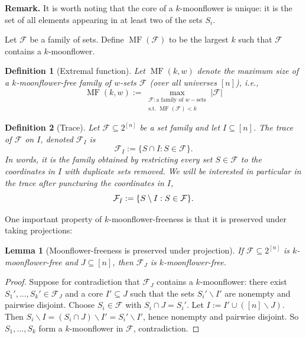 \documentclass{article}
\newtheorem{lemma}[lemma]{Lemma}
\newtheorem{definition}[definition]{Definition}
\DeclareMathOperator{\MF}{MF}
\newcommand{\<}{\langle}
\renewcommand{\>}{\rangle}
\newcommand{\calF}{\mathcal{F}}
\begin{document}
\noindent \textbf{Remark. }
It is worth noting that the core of a $k$-moonflower is unique: it is the set of all elements appearing in at least two of the sets $S_i$. 

Let $\calF$ be a family of sets. Define \emph{$\MF(\calF)$} to be the largest $k$ such that $\calF$ contains a $k$-moonflower.

\begin{definition}[Extremal function]\label{definition:extremal-moonflower}
    Let $\MF(k, w)$ denote the maximum size of a $k$-moonflower-free family of $w$-sets $\calF$ (over all universes $[n]$), i.e.,
    \[
    \MF(k, w) := \max_{\substack{\calF: \text{a family of }w-\text{sets} \\
    \text{s.t. }\MF(\calF) < k}} |\calF|
    \]
\end{definition}

\begin{definition}[Trace]\label{definition:trace}
    Let $\calF \subseteq 2^{[n]}$ be a set family and let $I \subseteq [n]$. The \emph{trace} of $\calF$ on $I$, denoted $\calF_I$ is
    \[
    \calF_I:= \{S \cap I: S \in \calF\}.
    \]
    In words, it is the family obtained by restricting every set $S \in \calF$ to the coordinates in $I$ with duplicate sets removed. We will be interested in particular in the trace after \emph{puncturing} the coordinates in $I$,
    \[
    \calF_{\Bar{I}}:= \{S \setminus I: S \in \calF\}.
    \]
\end{definition}

One important property of $k$-moonflower-freeness is that it is preserved under taking projections:
\begin{lemma}[Moonflower-freeness is preserved under projection]\label{lem:WSF_free_preserved_under_projection} If $\calF \subseteq 2^{[n]}$ is $k$-moonflower-free and $J \subseteq [n]$, then $\calF_J$ is $k$-moonflower-free.
\end{lemma}

\begin{proof}
    Suppose for contradiction that $\calF_J$ contains a $k$-moonflower: there exist $S_1',...,S_k' \in \calF_J$ and a core $I' \subseteq J$ such that the sets $S_i' \backslash I'$ are nonempty and pairwise disjoint. Choose $S_i \in \calF$ with $S_i \cap J = S_i'$. Let $I:= I' \cup ([n] \backslash J)$. Then $S_i \backslash I = (S_i \cap J) \backslash I' = S_i' \backslash I'$, hence nonempty and pairwise disjoint. So $S_1,...,S_k$ form a $k$-moonflower in $\calF$, contradiction.
\end{proof}
\end{document}
